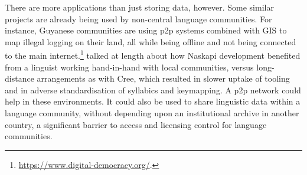 There are more applications than just storing data, however. Some similar projects are already being used by non-central language communities. For instance, Guyanese communities are using p2p systems combined with GIS to map illegal logging on their land, all while being offline and not being connected to the main internet.\footnote{\href{https://www.digital-democracy.org/}{https://www.digital-democracy.org/}. } \citet[90]{jancewicz2002applied} talked at length about how Naskapi development benefited from a linguist working hand-in-hand with local communities, versus long-distance arrangements as with Cree, which resulted in slower uptake of tooling and in adverse standardisation of syllabics and keymapping. A p2p network could help in these environments. It could also be used to share linguistic data within a language community, without depending upon an institutional archive in another country, a significant barrier to access and licensing control for language communities.
